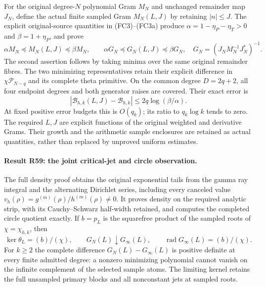 For the original degree-$N$ polynomial Gram $M_N$ and unchanged
remainder map $J_N$, define the actual finite sampled Gram
$M_N(L,J)$ by retaining $|n|\le J$. The explicit original-source
quantities in (FC3)--(FC3a) produce
$\alpha=1-\eta_P-\eta_T>0$ and $\beta=1+\eta_P$, and prove
\[
 \alpha M_N\preceq M_N(L,J)\preceq\beta M_N,\qquad
 \alpha G_N\preceq G_N(L,J)\preceq\beta G_N,
 \quad G_N=(J_NM_N^{-1}J_N^*)^{-1}.
\]
The second assertion follows by taking minima over the same original
remainder fibres. The two minimizing representatives retain their
explicit difference in $\chi\mathcal P_{N-q}$ and its complete
theta primitive. On the common degree $D=2q+2$, all four endpoint
degrees and both generator raises are covered. Their exact error is
\[
 \left|\mathcal B_{h,k}(L,J)-\mathcal B_{h,k}\right|
      \le2q\log(\beta/\alpha).
\]
At fixed positive error budgets this is $O(q_k)$; its ratio to
$q_k\log k$ tends to zero. The required $L,J$ are explicit functions
of the original weighted and derivative Grams. Their growth and the
arithmetic sample enclosures are retained as actual quantities, rather
than replaced by unproved uniform estimates.

\paragraph{Result R59: the joint critical-jet and circle observation.}
The full density proof obtains the original exponential tails from
the gamma ray integral and the alternating Dirichlet series, including
every canceled value $v_h(\rho)=g^{(m)}(\rho)/h^{(m)}(\rho)\ne0$.
It proves density on the required analytic strip, with its
Cauchy--Schwarz half-width retained, and computes the completed circle
quotient exactly. If $b=p_L$ is the squarefree product of the sampled
roots of $\chi=\chi_{h,k}$, then
\[
 \ker\theta_L=(b)/(\chi),\qquad
 G_N(L)\downarrow G_\infty(L),\qquad
 \operatorname{rad}G_\infty(L)=(b)/(\chi).
\]
For $k\ge2$ the complete difference $G_N(L)-G_\infty(L)$ is
positive definite at every finite admitted degree: a nonzero
minimizing polynomial cannot vanish on the infinite complement of
the selected sample atoms. The limiting kernel retains the full
unsampled primary blocks and all nonconstant jets at sampled roots.

